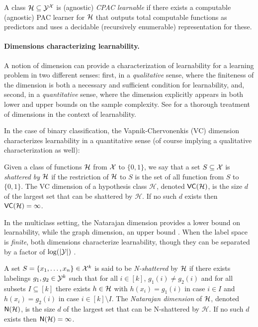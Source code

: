 \documentclass[11pt]{article}
\begin{document}
\begin{definition}
     A class $\mathcal{H}\subseteq\mathcal{Y}^{\mathcal{X}}$ is (agnostic) \emph{CPAC learnable} if there exists a computable (agnostic) PAC learner for $\mathcal{H}$ that outputs  total computable functions as predictors and uses a decidable (recursively enumerable) representation for these.
\end{definition}

\paragraph{Dimensions characterizing learnability.}
A notion of dimension can provide a characterization of learnability for a learning problem in two different senses: first, in a \emph{qualitative} sense, where the finiteness of the dimension is both a necessary and sufficient condition for learnability, and, second, in a \emph{quantitative} sense, where the dimension explicitly appears in both lower and upper bounds on the sample complexity. 
See \cite{pmlr-v247-lechner24a} for a thorough treatment of dimensions in the context of learnability.
%

In the case of binary classification, the Vapnik-Chervonenkis (VC) dimension characterizes learnability in a quantitative sense (of course implying a qualitative characterization as well):

\begin{definition}
    Given a class of functions $\mathcal{H}$ from $\mathcal{X}$ to $\{0,1\}$, we say that a set $S\subseteq\mathcal{X}$ is \emph{shattered by $\mathcal{H}$} if the restriction of $\mathcal{H}$ to $S$ is the set of all function from $S$ to $\{0,1\}$.
    The VC dimension of a hypothesis class $\mathcal{H}$, denoted $\mathsf{VC}(\mathcal{H})$, is the size $d$ of the largest set that can be shattered by $\mathcal{H}$.
    If no such $d$ exists then $\mathsf{VC}(\mathcal{H})=\infty$.
\end{definition}

In the multiclass setting, the Natarajan dimension provides a lower bound on learnability, while the graph dimension, an upper bound \citep{natarajan1988two,natarajan1989learning}.
When the label space is  \emph{finite}, both dimensions characterize learnability, though they can be separated by a factor of $\log(|\mathcal{Y}|)$ \citep{ben1992characterizations,daniely2011multiclass}. 

\begin{definition}
\label{def:natarajan}
    A set $S=\{x_1,\dots,x_n\}\in\mathcal{X}^k$ is said to be \emph{N-shattered} by $\mathcal{H}$ if there exists labelings $g_1,g_2\in\mathcal{Y}^k$ such that for all $i\in [k]$, $g_1(i)\neq g_2(i)$ and for all subsets $I\subseteq [k]$ there exists $h\in\mathcal{H}$ with $h(x_i)=g_1(i)$ in case $i\in I$ and $h(x_i)=g_2(i)$ in case $i\in [k]\setminus I$.
    The \emph{Natarajan dimension} of $\mathcal{H}$, denoted $\mathsf{N}(\mathcal{H})$, is the size $d$ of the largest set that can be N-shattered by $\mathcal{H}$.
    If no such $d$ exists then $\mathsf{N}(\mathcal{H})=\infty$.
\end{definition}
\end{document}
